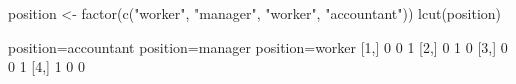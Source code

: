 \begin{Schunk}
% --begin: "lcut.factor"
\begin{Sinput}
 position <- factor(c("worker", "manager", "worker", "accountant"))
 lcut(position)
\end{Sinput}
\begin{Soutput}
     position=accountant position=manager position=worker
[1,]                   0                0               1
[2,]                   0                1               0
[3,]                   0                0               1
[4,]                   1                0               0
\end{Soutput}
%
% --end: "lcut.factor"
\end{Schunk}
